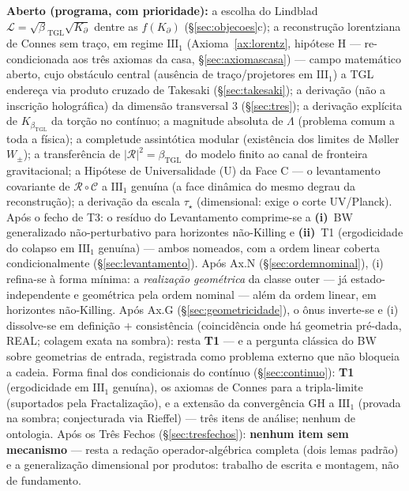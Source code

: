 \documentclass[11pt,a4paper]{article}
\newcommand{\bTGL}{\beta_{\mathrm{TGL}}}
\begin{document}
\smallskip\noindent\textbf{Aberto (programa, com prioridade):}
a escolha do Lindblad $\mathcal L=\sqrt\bTGL
\sqrt{K_\partial}$ dentre as $f(K_\partial)$ (\S\ref{sec:objecoes}c); a
reconstrução lorentziana de Connes sem traço, em regime $\mathrm{III}_1$
(Axioma~\ref{ax:lorentz}, hipótese H --- re-condicionada aos três axiomas
da casa, \S\ref{sec:axiomascasa}) --- campo matemático aberto, cujo
obstáculo central (ausência de traço/projetores em $\mathrm{III}_1$) a TGL
endereça via produto cruzado de Takesaki (\S\ref{sec:takesaki}); a derivação
(não a inscrição holográfica) da dimensão transversal $3$
(\S\ref{sec:tres}); a derivação explícita de $K_{\bTGL}$ da torção no
contínuo; a magnitude absoluta de $\Lambda$ (problema comum a toda a física); a
completude assintótica modular (existência dos limites de Møller $W_\pm$);
a transferência de $|\mathcal R|^2=\bTGL$ do modelo finito ao canal de
fronteira gravitacional; a Hipótese de Universalidade (U) da Face C --- o
levantamento covariante de $\mathcal R\circ\mathcal C$ a $\mathrm{III}_1$
genuína (a face dinâmica do mesmo degrau da reconstrução); a derivação da
escala $\tau_\star$ (dimensional: exige o corte UV/Planck). Após o fecho de
T3: o resíduo do Levantamento comprime-se a \textbf{(i)}~BW generalizado
não-perturbativo para horizontes não-Killing e \textbf{(ii)}~T1
(ergodicidade do colapso em $\mathrm{III}_1$ genuína) --- ambos nomeados,
com a ordem linear coberta condicionalmente (\S\ref{sec:levantamento}).
Após Ax.N (\S\ref{sec:ordemnominal}), (i) refina-se à forma mínima: a
\emph{realização geométrica} da classe outer --- já estado-independente e
geométrica pela ordem nominal --- além da ordem linear, em horizontes
não-Killing. Após Ax.G (\S\ref{sec:geometricidade}), o ônus inverte-se e
(i) dissolve-se em definição $+$ consistência (coincidência onde há
geometria pré-dada, \textsf{REAL}; colagem exata na sombra): resta
\textbf{T1} --- e a pergunta clássica do BW sobre geometrias de entrada,
registrada como problema externo que não bloqueia a cadeia. Forma final
dos condicionais do contínuo (\S\ref{sec:continuo}): \textbf{T1}
(ergodicidade em $\mathrm{III}_1$ genuína), os axiomas de Connes para a
tripla-limite (suportados pela Fractalização), e a extensão da
convergência GH a $\mathrm{III}_1$ (provada na sombra; conjecturada via
Rieffel) --- três itens de análise; nenhum de ontologia. Após os Três
Fechos (\S\ref{sec:tresfechos}): \textbf{nenhum item sem mecanismo} ---
resta a redação operador-algébrica completa (dois lemas padrão) e a
generalização dimensional por produtos: trabalho de escrita e montagem,
não de fundamento.
\end{document}
